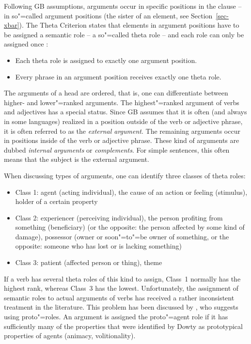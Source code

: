 Following GB assumptions, arguments occur in specific positions in the clause -- in so"=called argument positions (\eg the sister of 
an \xnull element, see Section~\ref{sec-xbar}). The Theta Criterion states that elements in argument positions have to be assigned
a semantic role -- a so"=called theta role -- and each role can only be assigned once \citep[]{Chomsky81a}: 
\begin{principle-break}\label{theta-Kriterium}
\begin{itemize}
\item Each theta role is assigned to exactly one argument position.
\item Every phrase in an argument position receives exactly one theta role.
\end{itemize}
\end{principle-break}
\noindent
The arguments of a head are ordered, that is, one can differentiate between higher- and lower"=ranked arguments. The highest"=ranked
argument of verbs and adjectives has a special status. Since GB assumes that it is often (and always in some languages) realized in a position
outside of the verb or adjective phrase, it is often referred to as the \emph{external argument}. The remaining
arguments occur in positions inside of the verb or adjective phrase. These kind of arguments are dubbed 
\emph{internal arguments} or \emph{complements}. For simple sentences, this often means that the subject
is the external argument.

When discussing types of arguments, one can identify three classes of theta roles:
\begin{itemize}
\item Class 1: agent (acting individual), the cause of an action or feeling (stimulus), holder of a certain property
\item Class 2: experiencer (perceiving individual), the person profiting from something (beneficiary)
(or the opposite: the person affected by some kind of damage), possessor (owner or soon"=to"=be owner of something, or the opposite:
someone who has lost or is lacking something) 
\item Class 3: patient (affected person or thing), theme
\end{itemize}
If a verb has several theta roles of this kind to assign, Class~1 normally has the highest rank, whereas Class~3 has the lowest.
Unfortunately, the assignment of semantic roles to actual arguments of verbs has received a rather inconsistent treatment in the 
literature. This problem has been discussed by \citet{Dowty91a}, who suggests using proto"=roles. An argument is assigned the
proto"=agent role if it has sufficiently many of the properties that were identified by Dowty as prototypical properties of agents (\eg animacy, volitionality).%
\nocite{Gruber65a-u,Fillmore68,Fillmore71a-u,Jackendoff72a-u,Dowty91a}


